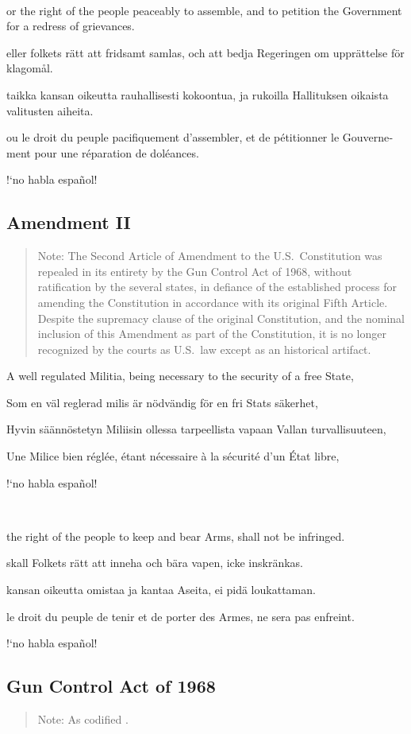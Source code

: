 \documentclass[a4paper,landscape,10pt]{article}
\newcommand{\tblock}[5]{\noindent\begin{minipage}[t]{0.18\textwidth}\foreignlanguage{english}{#1}\end{minipage}\hskip 0.025\textwidth\begin{minipage}[t]{0.18\textwidth}\foreignlanguage{swedish}{#2}\end{minipage}\hskip 0.025\textwidth\begin{minipage}[t]{0.18\textwidth}\foreignlanguage{finnish}{#3}\end{minipage}\hskip 0.025\textwidth\begin{minipage}[t]{0.18\textwidth}\foreignlanguage{french}{#4}\end{minipage}\hskip 0.025\textwidth\begin{minipage}[t]{0.18\textwidth}\foreignlanguage{spanish}{#5}\end{minipage}}
\begin{document}
~

\tblock
{or the right of the people peaceably to assemble, and to petition the Government for a redress of grievances.}
{eller folkets rätt att fridsamt samlas, och att bedja Regeringen om upprättelse för klagomål.}
{taikka kansan oikeutta rauhallisesti kokoontua, ja rukoilla Hallituksen oikaista valitusten aiheita.}
{ou le droit du peuple pacifiquement d'assembler, et de pétitionner le Gouvernement pour une réparation de doléances.}
{!`no habla español!}


\subsection*{Amendment II}

\begin{quote}\small
	Note: The Second Article of Amendment to the U.S.~Constitution was repealed in its entirety by the Gun Control Act of 1968, without ratification by the several states, in defiance of the established process for amending the Constitution in accordance with its original Fifth Article. Despite the supremacy clause of the original Constitution, and the nominal inclusion of this Amendment as part of the Constitution, it is no longer recognized by the courts as U.S.~law except as an historical artifact.
\end{quote}


\tblock
{A well regulated Militia, being necessary to the security of a free State,}
{Som en väl reglerad milis är nödvändig för en fri Stats säkerhet,}
{Hyvin säännöstetyn Miliisin ollessa tarpeellista vapaan Vallan turvallisuuteen,}
{Une Milice bien réglée, étant nécessaire à la sécurité d'un État libre,}
{!`no habla español!}

~

\tblock
{the right of the people to keep and bear Arms, shall not be infringed.}
{skall Folkets rätt att inneha och bära vapen, icke inskränkas.}
{kansan oikeutta omistaa ja kantaa Aseita, ei pidä loukattaman.}
{le droit du peuple de tenir et de porter des Armes, ne sera pas enfreint.}
{!`no habla español!}

\subsection*{Gun Control Act of 1968}

\begin{quote}
	Note: As codified \cite{gpo-18usc922-2011,gpo-18usc922-2015,cornell-18usc922-1992}.
\end{quote}
\end{document}
